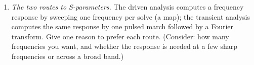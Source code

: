 \begin{enumerate}[nosep]
  $\rho_\infty = 0$ annihilates the highest-frequency modes in one step, while
  $\rho_\infty = 1$ preserves them. For a transient simulation polluted by ringing
  on the smallest mesh elements (unresolved high modes), which setting would you
  choose, and what is the risk of choosing $\rho_\infty$ too small (too much
  damping)?
  \item \emph{The two routes to S-parameters.} The driven analysis computes a
  frequency response by sweeping one frequency per solve (a 
  map); the transient analysis computes the same response by one pulsed march
  followed by a Fourier transform. Give one reason to prefer each route. (Consider:
  how many frequencies you want, and whether the response is needed at a few sharp
  frequencies or across a broad band.)
\end{enumerate}
